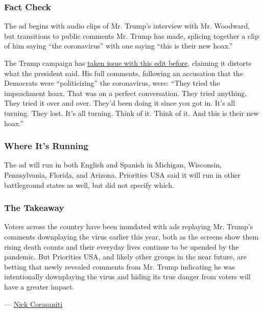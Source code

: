 \hypertarget{fact-check}{%
\subsubsection{Fact Check}\label{fact-check}}

The ad begins with audio clips of Mr. Trump's interview with Mr.
Woodward, but transitions to public comments Mr. Trump has made,
splicing together a clip of him saying ``the coronavirus'' with one
saying ``this is their new hoax.''

The Trump campaign has
\href{https://www.factcheck.org/2020/04/democratic-ad-twists-trumps-hoax-comment/}{taken
issue with this edit before}, claiming it distorts what the president
said. His full comments, following an accusation that the Democrats were
``politicizing'' the coronavirus, were: ``They tried the impeachment
hoax. That was on a perfect conversation. They tried anything. They
tried it over and over. They'd been doing it since you got in. It's all
turning. They lost. It's all turning. Think of it. Think of it. And this
is their new hoax.''

\hypertarget{where-its-running}{%
\subsubsection{\texorpdfstring{\textbf{Where It's
Running}}{Where It's Running}}\label{where-its-running}}

The ad will run in both English and Spanish in Michigan, Wisconsin,
Pennsylvania, Florida, and Arizona. Priorities USA said it will run in
other battleground states as well, but did not specify which.

\hypertarget{the-takeaway}{%
\subsubsection{The Takeaway}\label{the-takeaway}}

Voters across the country have been inundated with ads replaying Mr.
Trump's comments downplaying the virus earlier this year, both as the
screens show them rising death counts and their everyday lives continue
to be upended by the pandemic. But Priorities USA, and likely other
groups in the near future, are betting that newly revealed comments from
Mr. Trump indicating he was intentionally downplaying the virus and
hiding its true danger from voters will have a greater impact.

--- \href{https://www.nytimes3xbfgragh.onion/by/nick-corasaniti}{Nick
Corasaniti}

